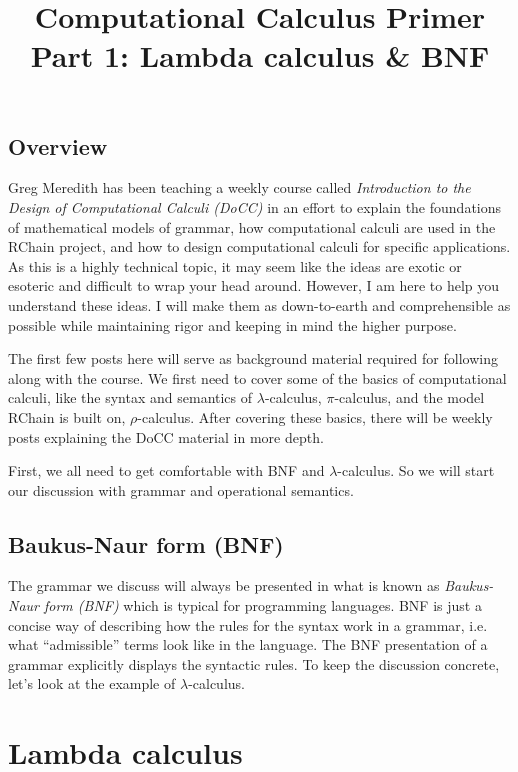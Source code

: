 \documentclass[12pt]{article}
\numberwithin{equation}{section}
\begin{document}
\author{}
\date{}
\title{Computational Calculus Primer Part 1: Lambda calculus \& BNF}

\maketitle

\subsection{Overview}
Greg Meredith has been teaching a weekly course called \emph{Introduction to the Design of Computational Calculi (DoCC)} in an effort to explain the foundations of mathematical models of grammar, how computational calculi are used in the RChain project, and how to design computational calculi for specific applications. As this is a highly technical topic, it may seem like the ideas are exotic or esoteric and difficult to wrap your head around. However, I am here to help you understand these ideas. I will make them as down-to-earth and comprehensible as possible while maintaining rigor and keeping in mind the higher purpose.

The first few posts here will serve as background material required for following along with the course. We first need to cover some of the basics of computational calculi, like the syntax and semantics of $\lambda$-calculus, $\pi$-calculus, and the model RChain is built on, $\rho$-calculus. After covering these basics, there will be weekly posts explaining the DoCC material in more depth.

First, we all need to get comfortable with BNF and $\lambda$-calculus. So we will start our discussion with grammar and operational semantics.

\subsection{Baukus-Naur form (BNF)}
The grammar we discuss will always be presented in what is known as \emph{Baukus-Naur form (BNF)} which is typical for programming languages. BNF is just a concise way of describing how the rules for the syntax work in a grammar, i.e. what ``admissible'' terms look like in the language. The BNF presentation of a grammar explicitly displays the syntactic rules. To keep the discussion concrete, let's look at the example of $\lambda$-calculus.

\section{Lambda calculus}
\end{document}
